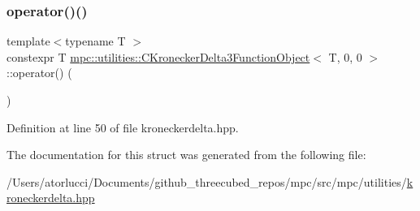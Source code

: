 \subsubsection{\texorpdfstring{operator()()}{operator()()}}
{\footnotesize\ttfamily template$<$typename T $>$ \\
constexpr T \mbox{\hyperlink{structmpc_1_1utilities_1_1_c_kronecker_delta3_function_object}{mpc\+::utilities\+::\+C\+Kronecker\+Delta3\+Function\+Object}}$<$ T, 0, 0 $>$\+::operator() (\begin{DoxyParamCaption}{ }\end{DoxyParamCaption})\hspace{0.3cm}{\ttfamily [inline]}}



Definition at line 50 of file kroneckerdelta.\+hpp.



The documentation for this struct was generated from the following file\+:\begin{DoxyCompactItemize}
\item 
/\+Users/atorlucci/\+Documents/github\+\_\+threecubed\+\_\+repos/mpc/src/mpc/utilities/\mbox{\hyperlink{kroneckerdelta_8hpp}{kroneckerdelta.\+hpp}}\end{DoxyCompactItemize}
